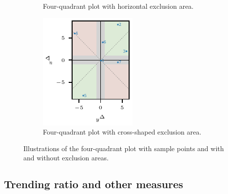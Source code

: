 \documentclass[pdflatex]{sn-jnl}
\theoremstyle{plain}%
\theoremstyle{definition}
\begin{document}
\begin{figure}
\begin{subfigure}[t]{.24\textwidth}
\caption{Four-quadrant plot with horizontal exclusion area.} \label{fig:trending_basic_4q_excl_axis}
\end{subfigure}\hspace{0.01\textwidth}%
\begin{subfigure}[t]{.24\textwidth}
\includegraphics{plots/illustrative_examples/4q_excl_cross}
\caption{Four-quadrant plot with cross-shaped exclusion area.}\label{fig:trending_basic_4q_excl_cross}
\end{subfigure}%
\caption{Illustrations of the four-quadrant plot with sample points and with and without exclusion areas.}
\label{fig:trending_4q}
\end{figure}

\subsection{Trending ratio and other measures}\label{subsec:trending-measures}
\end{document}
